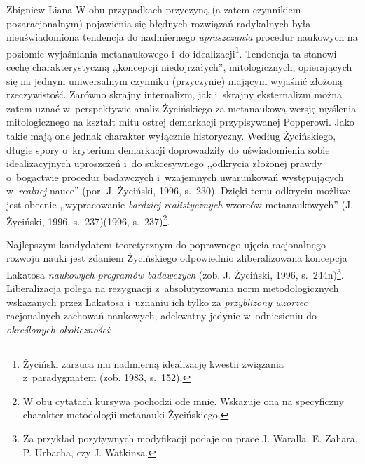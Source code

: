 \begin{artplenv}{Zbigniew Liana}
W obu przypadkach przyczyną (a zatem czynnikiem pozaracjonalnym) pojawienia się błędnych rozwiązań radykalnych była
nieuświadomiona tendencja do nadmiernego \textit{upraszczania} procedur naukowych na poziomie wyjaśniania
metanaukowego i~do idealizacji\footnote{Życiński zarzuca mu nadmierną idealizację kwestii związania z~paradygmatem
\label{ref:RNDIrA1jDg11P}(zob. 1983, s.~152).}. Tendencja ta stanowi cechę charakterystyczną ,,koncepcji niedojrzałych'',
mitologicznych, opierających się na jednym uniwersalnym czynniku (przyczynie) mającym wyjaśnić złożoną rzeczywistość.
Zarówno skrajny internalizm, jak i~skrajny eksternalizm można zatem uznać w~perspektywie analiz Życińskiego za
metanaukową wersję myślenia mitologicznego na kształt mitu ostrej demarkacji przypisywanej Popperowi. Jako takie mają
one jednak charakter wyłącznie historyczny. Według Życińskiego, długie spory o~kryterium demarkacji doprowadziły do
uświadomienia sobie idealizacyjnych uproszczeń i~do sukcesywnego ,,odkrycia złożonej prawdy o~bogactwie procedur
badawczych i~wzajemnych uwarunkowań występujących w~\textit{realnej} nauce'' \label{ref:RNDT7FuhQK2nh}(por. J. Życiński,
1996, s.~230). Dzięki temu odkryciu możliwe jest obecnie ,,wypracowanie \textit{bardziej realistycznych} wzorców
metanaukowych'' \label{ref:RND3dNAmoO0qC}(J. Życiński, 1996, s.~237)(1996, s.~237)\footnote{W obu cytatach kursywa
pochodzi ode mnie. Wskazuje ona na specyficzny charakter metodologii metanauki Życińskiego.}.

Najlepszym kandydatem teoretycznym do poprawnego ujęcia racjonalnego rozwoju nauki jest zdaniem Życińskiego odpowiednio
zliberalizowana koncepcja Lakatosa \textit{naukowych programów badawczych} \label{ref:RNDR4AQgoKDGC}(zob. J. Życiński,
1996, s.~244n)\footnote{Za przykład pozytywnych modyfikacji podaje on prace J. Waralla, E. Zahara, P. Urbacha, czy J.
Watkinsa.}. Liberalizacja polega na rezygnacji z~absolutyzowania norm metodologicznych wskazanych przez
Lakatosa i~uznaniu ich tylko za \textit{przybliżony wzorzec} racjonalnych zachowań naukowych, adekwatny
jedynie w~odniesieniu do
\textit{określonych okoliczności}:


\end{artplenv}
